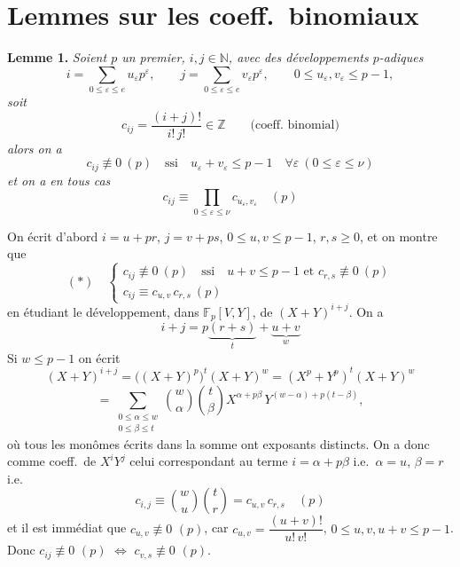 \documentclass[11pt,a4paper]{article}
\begin{document}
\section{Lemmes sur les coeff.\ binomiaux}

\textbf{Lemme 1.} \emph{Soient $p$ un premier, $i, j \in \mathbb{N}$, avec des développements $p$-adiques
\[ i = \sum_{0 \leq \varepsilon \leq e} u_\varepsilon p^\varepsilon, \qquad j = \sum_{0 \leq \varepsilon \leq e} v_\varepsilon p^\varepsilon, \qquad 0 \leq u_\varepsilon, v_\varepsilon \leq p-1, \]
soit
\[ c_{ij} = \frac{(i+j)!}{i!\,j!} \in \mathbb{Z} \qquad \text{(coeff.\ binomial)} \]
alors on a
\[ c_{ij} \not\equiv 0 \ (p) \quad \text{ssi} \quad u_\varepsilon + v_\varepsilon \leq p-1 \quad \forall \varepsilon \ (0 \leq \varepsilon \leq \nu) \]
et \struck{\ill{}} on a en tous cas
\[ c_{ij} \equiv \prod_{0 \leq \varepsilon \leq \nu} c_{u_\varepsilon, v_\varepsilon} \quad (p) \]}

On écrit d'abord $i = u + pr$, $j = v + ps$, $0 \leq u, v \leq p-1$, $r, s \geq 0$, et on montre que
\[ (*) \quad \begin{cases} c_{ij} \not\equiv 0 \ (p) \quad \text{ssi} \quad u + v \leq p-1 \text{ et } c_{r,s} \not\equiv 0 \ (p) \\ c_{ij} \equiv c_{u,v}\, c_{r,s} \ (p) \end{cases} \]
en étudiant le développement, dans $\mathbb{F}_p[V, Y]$, de $(X+Y)^{i+j}$. \struck{\ill{}} On a
\[ i + j = p\underbrace{(r+s)}_{t} + \underbrace{u+v}_{w} \]
Si $w \leq p-1$ on écrit
\[ (X+Y)^{i+j} = \bigl((X+Y)^p\bigr)^t (X+Y)^w = (X^p + Y^p)^t (X+Y)^w \]
\[ = \sum_{\substack{0 \leq \alpha \leq w \\ 0 \leq \beta \leq t}} \binom{w}{\alpha} \binom{t}{\beta} X^{\alpha + p\beta}\, Y^{(w-\alpha) + p(t-\beta)}, \]
où tous les monômes écrits dans la somme ont  exposants distincts. On a donc comme coeff.\ de $X^i Y^j$ celui correspondant au terme $i = \alpha + p\beta$ i.e.\ $\alpha = u$, $\beta = r$ i.e.
\[ c_{i,j} \equiv \binom{w}{u} \binom{t}{r} = c_{u,v}\, c_{r,s} \quad (p) \]
et il est immédiat que $c_{u,v} \not\equiv 0$ $(p)$, car $c_{u,v} = \dfrac{(u+v)!}{u!\,v!}$, $0 \leq u, v, u+v \leq p-1$. Donc $c_{ij} \not\equiv 0$ $(p)$ $\Leftrightarrow$ $c_{v,s} \not\equiv 0$ $(p)$.
\end{document}
